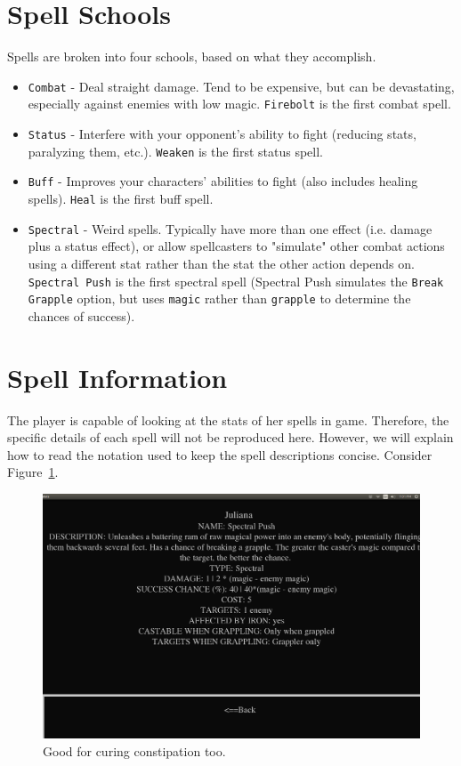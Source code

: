 \documentclass{report}
\begin{document}
\begin{itemize}
\begin{itemize}
\section{Spell Schools}
\label{sec_schools}
Spells are broken into four schools, based on what they accomplish.
\begin{itemize}
    \item \verb|Combat| - Deal straight damage. Tend to be expensive, but can be devastating, especially against enemies with low magic. \verb|Firebolt| is the first 
    combat spell.
    \item \verb|Status| - Interfere with your opponent's ability to fight (reducing stats, paralyzing them, etc.). \verb|Weaken| is the first status spell.
    \item \verb|Buff| - Improves your characters' abilities to fight (also includes healing spells). \verb|Heal| is the first buff spell.
    \item \verb|Spectral| - Weird spells. Typically have more than one effect (i.e. damage plus a status effect), or allow spellcasters to "simulate" other combat actions using a different stat rather than the stat the other action depends on. \verb|Spectral Push| is the first spectral spell (Spectral Push simulates the \verb|Break Grapple| 
    option, but uses \verb|magic| rather than \verb|grapple| to determine the chances of success).
\end{itemize}

\section{Spell Information}

The player is capable of looking at the stats of her spells in game. Therefore, the specific details of each spell will not be reproduced here. However, we will explain
how to read the notation used to keep the spell descriptions concise. Consider Figure~\ref{fig_spell}.

\begin{figure}[h!]
    \includegraphics[width=\textwidth]{spell}
    \caption{Good for curing constipation too.}
    \label{fig_spell}
\end{figure}



\end{itemize}
\end{itemize}
\end{document}
